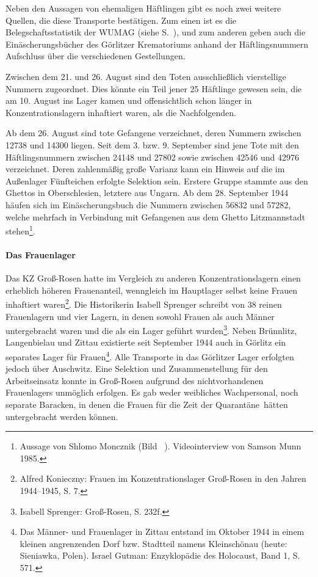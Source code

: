 \documentclass[a4paper,12pt,ngerman,
]{nisebook}
\begin{document}
Neben den Aussagen von ehemaligen Häftlingen gibt es noch zwei weitere Quellen, die diese Transporte bestätigen. Zum einen ist es die Belegschaftsstatistik der WUMAG (siehe S.~\pageref{wumag_pers}), und zum anderen geben auch die Einäscherungsbücher des Görlitzer Krematoriums anhand der Häftlingsnummern Aufschluss über die verschiedenen Gestellungen.\newline


Zwischen dem 21. und 26. August sind den Toten ausschließlich vierstellige Nummern zugeordnet. Dies könnte ein Teil jener 25 Häftlinge gewesen sein, die am 10. August ins Lager kamen und offensichtlich schon länger in Konzentrationslagern inhaftiert waren, als die Nachfolgenden.\newline

Ab dem 26. August sind tote Gefangene verzeichnet, deren Nummern zwischen 12738 und 14300 liegen. Seit dem 3. bzw. 9. September sind jene Tote mit den Häftlingsnummern zwischen 24148 und 27802 sowie zwischen 42546 und 42976 verzeichnet. Deren zahlenmäßig große Varianz kann ein Hinweis auf die im Außenlager Fünfteichen erfolgte Selektion sein. Erstere Gruppe stammte aus den Ghettos in Oberschlesien, letztere aus Ungarn.
Ab dem 28. September 1944 häufen sich im Einäscherungsbuch die Nummern zwischen 56832 und 57282, welche mehrfach in Verbindung mit Gefangenen aus dem Ghetto Litzmannstadt stehen\footnote{Aussage von Shlomo Moncznik (Bild ~). Videointerview von Samson Munn 1985.}.


\paragraph{Das Frauenlager}
Das KZ Groß-Rosen hatte im Vergleich zu anderen Konzentrationslagern einen erheblich höheren Frauenanteil, wenngleich im Hauptlager selbst keine Frauen inhaftiert waren\footnote{Alfred Konieczny: Frauen im Konzentrationslager Groß-Rosen in den Jahren 1944--1945, S. 7.}. Die Historikerin Isabell Sprenger schreibt von 38 reinen Frauenlagern und vier Lagern, in denen sowohl Frauen als auch Männer untergebracht waren und die als ein Lager geführt wurden\footnote{Isabell Sprenger: Groß-Rosen, S. 232f.}. Neben Brünnlitz, Langenbielau und Zittau existierte seit September 1944 auch in Görlitz ein separates Lager für Frauen\footnote{Das Männer- und Frauenlager in Zittau entstand im Oktober 1944 in einem kleinen angrenzenden Dorf bzw. Stadtteil namens Kleinschönau (heute: Sieniawka, Polen). Israel Gutman: Enzyklopädie des Holocaust, Band 1, S. 571.}. Alle Transporte in das Görlitzer Lager erfolgten jedoch über Auschwitz. Eine Selektion und Zusammenstellung für den Arbeitseinsatz konnte in Groß-Rosen aufgrund des nichtvorhandenen Frauenlagers unmöglich erfolgen. Es gab weder weibliches Wachpersonal, noch separate Baracken, in denen die Frauen für die Zeit der \glqq Quarantäne\grqq~hätten untergebracht werden können.\newline
\end{document}
